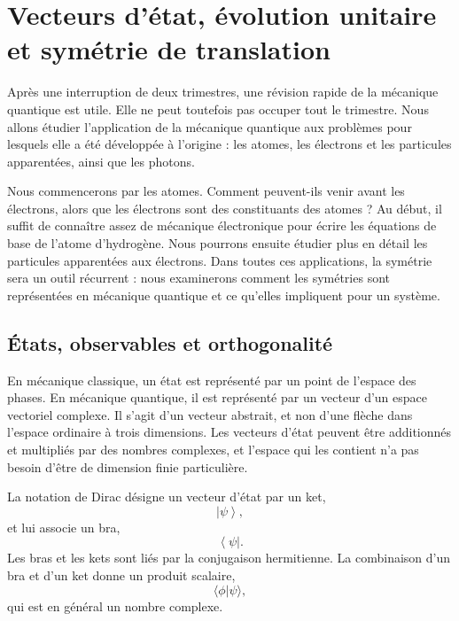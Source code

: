 \chapter{Vecteurs d’état, évolution unitaire et symétrie de translation}
\providecommand{\ket}[1]{\left\lvert#1\right\rangle}
\providecommand{\bra}[1]{\left\langle#1\right\rvert}

Après une interruption de deux trimestres, une révision rapide de la mécanique quantique est utile. Elle ne peut toutefois pas occuper tout le trimestre. Nous allons étudier l’application de la mécanique quantique aux problèmes pour lesquels elle a été développée à l’origine : les atomes, les électrons et les particules apparentées, ainsi que les photons.

Nous commencerons par les atomes. Comment peuvent-ils venir avant les électrons, alors que les électrons sont des constituants des atomes ? Au début, il suffit de connaître assez de mécanique électronique pour écrire les équations de base de l’atome d’hydrogène. Nous pourrons ensuite étudier plus en détail les particules apparentées aux électrons. Dans toutes ces applications, la symétrie sera un outil récurrent : nous examinerons comment les symétries sont représentées en mécanique quantique et ce qu’elles impliquent pour un système.

\section{États, observables et orthogonalité}

En mécanique classique, un état est représenté par un point de l’espace des phases. En mécanique quantique, il est représenté par un vecteur d’un espace vectoriel complexe. Il s’agit d’un vecteur abstrait, et non d’une flèche dans l’espace ordinaire à trois dimensions. Les vecteurs d’état peuvent être additionnés et multipliés par des nombres complexes, et l’espace qui les contient n’a pas besoin d’être de dimension finie particulière.

La notation de Dirac désigne un vecteur d’état par un ket,
\begin{equation}
\ket{\psi},
\end{equation}
et lui associe un bra,
\begin{equation}
\bra{\psi}.
\end{equation}
Les bras et les kets sont liés par la conjugaison hermitienne. La combinaison d’un bra et d’un ket donne un produit scalaire,
\begin{equation}
\langle\phi|\psi\rangle,
\end{equation}
qui est en général un nombre complexe.

